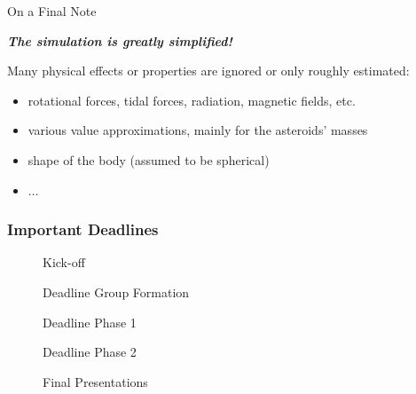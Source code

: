 \begin{frame}{On a Final Note}
    \begin{center}
        \Large\bfseries\itshape
        The simulation is greatly simplified!
    \end{center}
    \pause
    \vfill
    Many physical effects or properties are ignored or only roughly estimated:
    \begin{itemize}
        \item rotational forces, tidal forces, radiation, magnetic fields, etc.
        \item various value approximations, mainly for the asteroids' masses
        \item shape of the body (assumed to be spherical)
        \item $\dots$
    \end{itemize}
    \pause
    \vfill
\end{frame}

\begin{frame}[label={important_deadlines}]
  \frametitle{Important Deadlines}

  \begin{description}
    \item[\dateKickoffPhaseOne] Kick-off
    \item[\dateDeadlinePhaseZero] Deadline Group Formation
    \item[\dateDeadlinePhaseOne] Deadline Phase 1
    \item[\dateDeadlinePhaseTwo] Deadline Phase 2
    \item[\dateFinal] Final Presentations%
  \end{description}
  \vfill
\end{frame}
